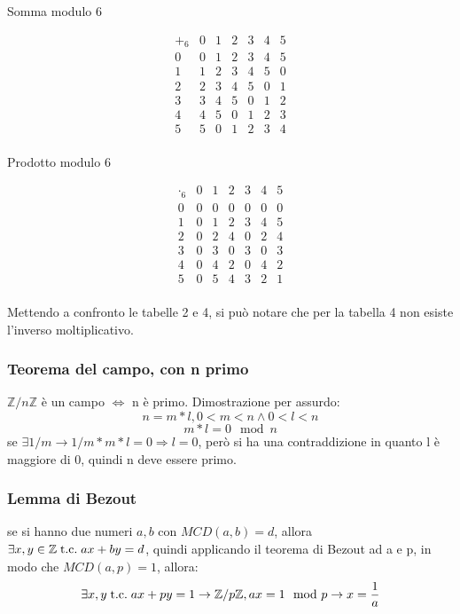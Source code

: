 \documentclass[a4paper,12pt]{article}
\begin{document}
	\begin{table}[h!]
		\centering
		\begin{minipage}{0.45\textwidth}
			\centering
			\caption*{Somma modulo 6}
			\[
			\begin{array}{c|cccccc}
				+_6 & 0 & 1 & 2 & 3 & 4 & 5 \\
				\hline
				0 & 0 & 1 & 2 & 3 & 4 & 5 \\
				1 & 1 & 2 & 3 & 4 & 5 & 0 \\
				2 & 2 & 3 & 4 & 5 & 0 & 1 \\
				3 & 3 & 4 & 5 & 0 & 1 & 2 \\
				4 & 4 & 5 & 0 & 1 & 2 & 3 \\
				5 & 5 & 0 & 1 & 2 & 3 & 4 \\
			\end{array}
			\]
		\end{minipage}
		\hfill
		\begin{minipage}{0.45\textwidth}
			\centering
			\caption*{Prodotto modulo 6}
			\[
			\begin{array}{c|cccccc}
				\cdot_6 & 0 & 1 & 2 & 3 & 4 & 5 \\
				\hline
				0 & 0 & 0 & 0 & 0 & 0 & 0 \\
				1 & 0 & 1 & 2 & 3 & 4 & 5 \\
				2 & 0 & 2 & 4 & 0 & 2 & 4 \\
				3 & 0 & 3 & 0 & 3 & 0 & 3 \\
				4 & 0 & 4 & 2 & 0 & 4 & 2 \\
				5 & 0 & 5 & 4 & 3 & 2 & 1 \\
			\end{array}
			\]
		\end{minipage}
	\end{table}	
	Mettendo a confronto le tabelle 2 e 4, si può notare che per la tabella 4 non esiste l'inverso moltiplicativo.
	
	\subsubsection{Teorema del campo, con n primo}
	$\mathbb{Z}/n\mathbb{Z}$ è un campo $\iff$ n è primo.
	Dimostrazione per assurdo:
	\[n = m*l, 0 < m < n \wedge 0<l<n\]
	\[m*l = 0 \mod{n}\]
	se $\exists 1/m \rightarrow 1/m * m *l = 0 \Rightarrow l = 0$, però si ha una contraddizione in quanto  l è maggiore di 0, quindi n deve essere primo.
	
	\subsubsection{Lemma di Bezout}
	se si hanno due numeri $a,b$ con $MCD(a,b) = d$, allora $\exists x,y \in \mathbb{Z} \;\text{t.c.}\; ax + by = d$, quindi applicando il teorema di Bezout ad a e p, in modo che $MCD(a, p) = 1$, allora:
	\[\exists x,y \;\text{t.c.}\; ax + py = 1 \rightarrow \mathbb{Z}/p\mathbb{Z}, ax = 1 \mod p \rightarrow x = \frac{1}{a}\]
\end{document}

